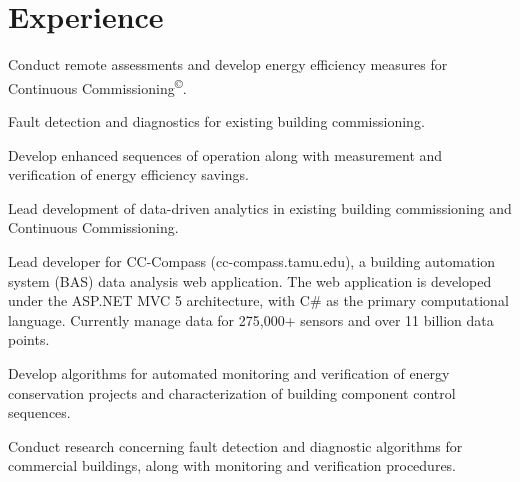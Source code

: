 \documentclass[]{deedy-resume-openfont}
\begin{document}
\begin{minipage}[t]{0.66\textwidth}


\section{Experience}

\sectionsep
\begin{tightemize}
\item Conduct remote assessments and develop energy efficiency measures for Continuous Commissioning\textsuperscript{\copyright{}}.
\item Fault detection and diagnostics for existing building commissioning.
\item Develop enhanced sequences of operation along with measurement and verification of energy efficiency savings.
\item Lead development of data-driven analytics in existing building commissioning and Continuous Commissioning\textsuperscript{\textregistered{}}.
\end{tightemize}

\vspace{0.1in}


\vspace{\topsep} %
\begin{tightemize}
\item Lead developer for CC-Compass (cc-compass.tamu.edu), a building automation system
(BAS) data analysis web application. The web application is developed under the ASP.NET
MVC 5 architecture, with C\# as the primary computational language. Currently manage
data for 275,000+ sensors and over 11 billion data points.
\item Develop algorithms for automated monitoring and verification of energy conservation projects and characterization of building component control sequences.
	\item Conduct research concerning fault detection and diagnostic algorithms for commercial buildings, along with monitoring and verification procedures.
\end{tightemize}
\sectionsep



\end{minipage}
\end{document}
